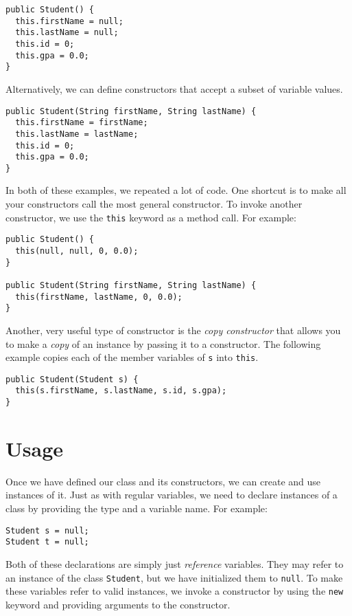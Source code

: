 \begin{verbatim}
public Student() {
  this.firstName = null;
  this.lastName = null;
  this.id = 0;
  this.gpa = 0.0;
}
\end{verbatim}

Alternatively, we can define constructors that accept a subset of 
variable values.

\begin{verbatim}
public Student(String firstName, String lastName) {
  this.firstName = firstName;
  this.lastName = lastName;
  this.id = 0;
  this.gpa = 0.0;
}
\end{verbatim}

In both of these examples, we repeated a lot of code.  One shortcut
is to make all your constructors call the most general constructor.
To invoke another constructor, we use the \texttt{this}
keyword as a method call.  For example:

\begin{verbatim}
public Student() {
  this(null, null, 0, 0.0);
}

public Student(String firstName, String lastName) {
  this(firstName, lastName, 0, 0.0);
}
\end{verbatim}

Another, very useful type of constructor is the 
\emph{copy constructor}
that allows you to make a \emph{copy} of an instance by passing
it to a constructor.  The following example copies each of the
member variables of \texttt{s} into \texttt{this}.

\begin{verbatim}
public Student(Student s) {
  this(s.firstName, s.lastName, s.id, s.gpa);
}
\end{verbatim}

\section{Usage}

Once we have defined our class and its constructors, we can 
create and use instances of it.  Just as with regular variables, 
we need to declare instances of a class by providing the type
and a variable name.  For example:

\begin{verbatim}
Student s = null;
Student t = null;
\end{verbatim}

Both of these declarations are simply just \emph{reference} variables.
They may refer to an instance of the class \texttt{Student}, but
we have initialized them to \texttt{null}.  To make
these variables refer to valid instances, we invoke a constructor
by using the \texttt{new} keyword and providing arguments
to the constructor.

